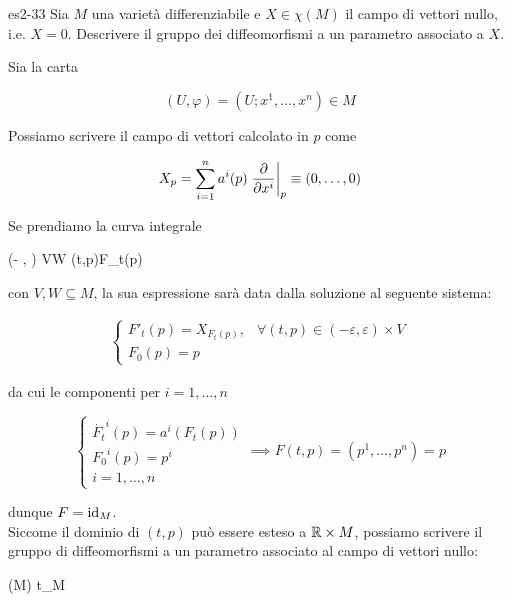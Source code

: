 {es2-33}
{
Sia $ M $ una varietà differenziabile e $ X \in \chi(M) $ il campo di vettori nullo, i.e. $ X = 0 $. Descrivere il gruppo dei diffeomorfismi a un parametro associato a $ X $.
}
{
Sia la carta

\begin{equation}
	(U, \varphi) = (U; x^{1},\dots,x^{n}) \in M
\end{equation}

Possiamo scrivere il campo di vettori calcolato in $ p $ come

\begin{equation}
	X_{p} = \sum_{i=1}^{n} a^{i}(p) \eval{ \pdv{x^{i}} }_{p} \equiv (0,\dots,0)
\end{equation}

Se prendiamo la curva integrale

	{(- \varepsilon, \varepsilon) \times V}{W}
	{(t,p)}{F_{t}(p)}

con $ V,W \subseteq M $, la sua espressione sarà data dalla soluzione al seguente sistema:

\begin{align}
	\begin{cases}
		F'_{t}(p) = X_{F_{t}(p)}, & \forall (t,p) \in (- \varepsilon, \varepsilon) \times V \\
		F_{0}(p) = p
	\end{cases}
\end{align}

da cui le componenti per $ i = 1,\dots,n $

\begin{equation}
	\begin{cases}
		\dot{F_{t}}^{i}(p) = a^{i}(F_{t}(p)) \\
		{F_{0}}^{i}(p) = p^{i} \\
		i = 1,\dots,n
	\end{cases} %
	\implies %
	F(t,p) = (p^{1},\dots,p^{n}) = p
\end{equation}

dunque $ F = \operatorname{id}_{M} $. \\
Siccome il dominio di $ (t,p) $ può essere esteso a $ \mathbb{R} \times M $, possiamo scrivere il gruppo di diffeomorfismi a un parametro associato al campo di vettori nullo:

	{\R}{(M)}
	{t}{\id_{M}}
}


